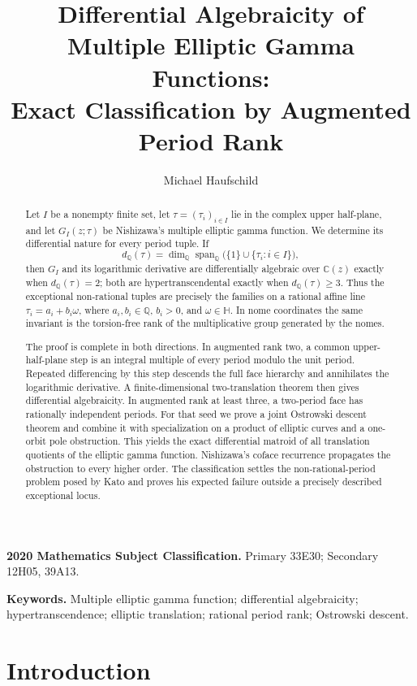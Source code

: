 \documentclass[11pt]{article}
\title{\bfseries Differential Algebraicity of Multiple Elliptic Gamma Functions:\\
Exact Classification by Augmented Period Rank}
\author{Michael Haufschild}
\date{}
\numberwithin{equation}{section}
\theoremstyle{definition}
\theoremstyle{remark}
\newcommand{\C}{\mathbb C}
\newcommand{\Q}{\mathbb Q}
\newcommand{\Span}{\operatorname{span}}
\begin{document}
\maketitle

\begin{abstract}
Let $I$ be a nonempty finite set, let $\tau=(\tau_i)_{i\in I}$ lie in the
complex upper half-plane, and let $G_I(z;\tau)$ be Nishizawa's multiple
elliptic gamma function.  We determine its differential nature for every
period tuple.  If
\[
 d_{\Q}(\tau)=
 \dim_{\Q}\Span_{\Q}\bigl(\{1\}\cup\{\tau_i:i\in I\}\bigr),
\]
then $G_I$ and its logarithmic derivative are differentially algebraic over
$\C(z)$ exactly when $d_{\Q}(\tau)=2$; both are hypertranscendental exactly
when $d_{\Q}(\tau)\geq3$.  Thus the exceptional non-rational tuples are
precisely the families on a rational affine line
$\tau_i=a_i+b_i\omega$, where $a_i,b_i\in\Q$, $b_i>0$, and
$\omega\in\mathbb H$.  In nome coordinates the same invariant is the
torsion-free rank of the multiplicative group generated by the nomes.

The proof is complete in both directions.  In augmented rank two, a common
upper-half-plane step is an integral multiple of every period modulo the
unit period.  Repeated differencing by this step descends the full face
hierarchy and annihilates the logarithmic derivative.  A finite-dimensional
two-translation theorem then gives differential algebraicity.  In augmented
rank at least three, a two-period face has rationally independent periods.
For that seed we prove a joint Ostrowski descent theorem and combine it with
specialization on a product of elliptic curves and a one-orbit pole
obstruction.  This yields the exact differential matroid of all translation
quotients of the elliptic gamma function.  Nishizawa's coface recurrence
propagates the obstruction to every higher order.  The classification
settles the non-rational-period problem posed by Kato and proves his expected
failure outside a precisely described exceptional locus.
\end{abstract}

\noindent\textbf{2020 Mathematics Subject Classification.}
Primary 33E30; Secondary 12H05, 39A13.

\noindent\textbf{Keywords.}
Multiple elliptic gamma function; differential algebraicity;
hypertranscendence; elliptic translation; rational period rank;
Ostrowski descent.

\section{Introduction}
\end{document}
